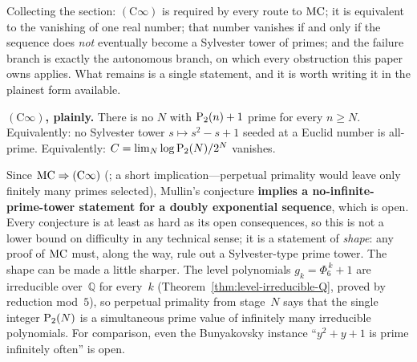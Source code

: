 Collecting the section: $(\mathrm{C}\infty)$ is required by every route to
$\mathrm{MC}$; it is equivalent to the vanishing of one real number; that number
vanishes if and only if the sequence does \emph{not} eventually become a
Sylvester tower of primes; and the failure branch is exactly the autonomous
branch, on which every obstruction this paper owns applies.  What remains is
a single statement, and it is worth writing it in the plainest form
available.

\begin{keyresult}
\textbf{$(\mathrm{C}\infty)$, plainly.}
There is no $N$ with $\mathrm{P}_{2}(n)+1$ prime for every $n \geq N$.
Equivalently: no Sylvester tower $s \mapsto s^2-s+1$ seeded at a Euclid
number is all-prime.  Equivalently:
$C = \lim_N \log\mathrm{P}_{2}(N)/2^{N}$ vanishes.
\end{keyresult}

\noindent
Since $\mathrm{MC} \Rightarrow (\mathrm{C}\infty)$
(;
a short implication---perpetual primality would leave only finitely many
primes selected), Mullin's conjecture \textbf{implies a
no-infinite-prime-tower statement for a doubly exponential sequence},
which is open.  Every conjecture is at least as hard as its open
consequences, so this is not a lower bound on difficulty in any
technical sense; it is a statement of \emph{shape}: any proof of $\mathrm{MC}$
must, along the way, rule out a Sylvester-type prime tower.  The shape can
be made a little sharper.  The level polynomials $g_k = \Phi_6^{\,k}+1$ are
irreducible over~$\mathbb{Q}$ for every~$k$
(Theorem~\ref{thm:level-irreducible-Q}, proved by reduction mod~$5$), so
perpetual primality from stage~$N$ says that the single integer
$\mathrm{P}_{2}(N)$ is a simultaneous prime value of infinitely many irreducible
polynomials.  For comparison, even the Bunyakovsky instance ``$y^2+y+1$ is
prime infinitely often'' is open.

